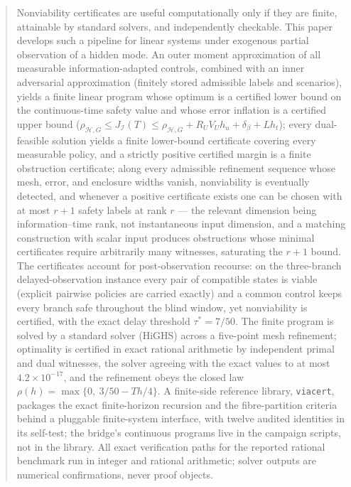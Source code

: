 \documentclass[10pt,twocolumn]{article}
\theoremstyle{plain}
\theoremstyle{definition}
\theoremstyle{remark}
\begin{document}
\begin{abstract}
Nonviability certificates are useful computationally only if they are finite,
attainable by standard solvers, and independently checkable. This paper
develops such a pipeline for linear systems under exogenous partial
observation of a hidden mode. An outer moment approximation of all measurable
information-adapted controls, combined with an inner adversarial approximation (finitely stored
admissible labels and scenarios), yields a finite linear program whose
optimum is a certified lower bound on the continuous-time safety value and
whose error inflation is a certified upper bound
(\(\rho_{\mathcal{H},G} \le J_{\mathcal{I}}(T) \le \rho_{\mathcal{H},G} +
R_U V_U h_u + \delta_\beta + L h_t\)); every dual-feasible solution yields a finite lower-bound certificate
covering every measurable policy, and a strictly positive certified margin
is a finite obstruction certificate; along every admissible refinement
sequence whose mesh, error, and enclosure widths vanish, nonviability is
eventually detected, and whenever a positive certificate exists one can be
chosen with at most \(r + 1\) safety labels at rank \(r\) --- the relevant
dimension being information--time rank, not instantaneous input dimension,
and a matching construction with scalar input produces obstructions whose
minimal certificates require arbitrarily many witnesses, saturating the
\(r + 1\) bound. The certificates account for post-observation
recourse: on the three-branch delayed-observation instance every pair of compatible
states is viable (explicit pairwise policies are carried exactly) and a
common control keeps every branch safe throughout the blind window, yet nonviability is certified, with the exact
delay threshold \(\tau^{*} = 7/50\). The finite program is solved by a
standard solver (HiGHS) across a five-point mesh refinement; optimality is
certified in exact rational arithmetic by independent primal and dual
witnesses, the solver agreeing with the exact values to at most
\(4.2 \times 10^{-17}\), and the refinement obeys the closed law
\(\rho(h) = \max\{0,\ 3/50 - Th/4\}\). A finite-side reference library,
\texttt{viacert}, packages the exact finite-horizon recursion and the
fibre-partition criteria behind a pluggable finite-system interface, with
twelve audited identities in its self-test; the bridge's continuous
programs live in the campaign scripts, not in the library. All exact verification paths for the reported rational benchmark run in
integer and rational arithmetic; solver outputs are numerical
confirmations, never proof objects.
\end{abstract}
\end{document}
